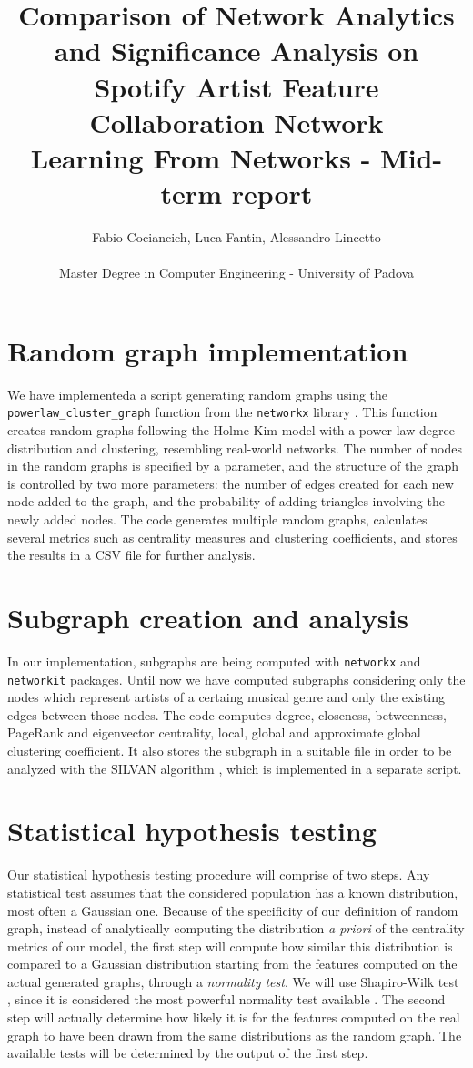 \documentclass[a4paper, 12pt, conference]{ieeeconf}      %
\title{Comparison of Network Analytics and Significance Analysis on Spotify Artist Feature Collaboration Network\\
\large Learning From Networks - Mid-term report \\}
\author{Fabio Cociancich, Luca Fantin, Alessandro Lincetto %
\\\\ Master Degree in Computer Engineering - University of Padova \\
}
\begin{document}
\maketitle
\thispagestyle{plain}
\pagestyle{plain}

\section{Random graph implementation}
We have implementeda a script generating random graphs using the \texttt{powerlaw\_cluster\_graph} function from the \texttt{networkx} library \cite{NetworkX_Graph}. This function creates random graphs following the Holme-Kim model \cite{Holme2002} with a power-law degree distribution and clustering, resembling real-world networks. The number of nodes in the random graphs is specified by a parameter, and the structure of the graph is controlled by two more parameters: the number of edges created for each new node added to the graph, and the probability of adding triangles involving the newly added nodes. The code generates multiple random graphs, calculates several metrics such as centrality measures and clustering coefficients, and stores the results in a CSV file for further analysis.

\section{Subgraph creation and analysis}
In our implementation, subgraphs are being computed with \texttt{networkx} and \texttt{networkit} packages.
Until now we have computed subgraphs considering only the nodes which represent artists of a certaing musical genre and only the existing edges between those nodes. The code computes degree, closeness, betweenness, PageRank and eigenvector centrality, local, global and approximate global clustering coefficient. It also stores the subgraph in a suitable file in order to be analyzed with the SILVAN algorithm \cite{SILVAN}, which is implemented in a separate script.

\section{Statistical hypothesis testing}

Our statistical hypothesis testing procedure will comprise of two steps. Any statistical test assumes that the considered population has a known distribution, most often a Gaussian one. Because of the specificity of our definition of random graph, instead of analytically computing the distribution \emph{a priori} of the centrality metrics of our model, the first step will compute how similar this distribution is compared to a Gaussian distribution starting from the features computed on the actual generated graphs, through a \emph{normality test}. We will use Shapiro-Wilk test \cite{ShapiroWilk1965}, since it is considered the most powerful normality test available \cite{RazaliYap2011}. The second step will actually determine how likely it is for the features computed on the real graph to have been drawn from the same distributions as the random graph. The available tests will be determined by the output of the first step.
\end{document}
